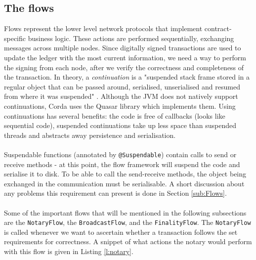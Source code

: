 \documentclass[12pt,twoside]{article}
\begin{document}
\subsection{The flows}
\label{sub:TheFlows}
Flows represent the lower level network protocols that implement contract-specific business logic. These actions are performed sequentially, exchanging messages across multiple nodes. Since digitally signed transactions are used to update the ledger with the most current information, we need a way to perform the signing from each node, after we verify the correctness and completeness of the transaction. In theory, a \textit{continuation} is a "suspended stack frame stored in a regular object that can be passed around, serialised, unserialised and resumed from where it was suspended" \cite{Corda:docs}. Although the JVM does not natively support continuations, Corda uses the Quasar library which implements them. Using continuations has several benefits: the code is free of callbacks (looks like sequential code), suspended continuations take up less space than suspended threads and abstracts away persistence and serialisation.
\\ \\
Suspendable functions (annotated by \verb|@Suspendable|) contain calls to send or receive methods - at this point, the flow framework will suspend the code and serialise it to disk. To be able to call the send-receive methods, the object being exchanged in the communication must be serialisable. A short discussion about any problems this requirement can present is done in Section \ref{sub:Flows}.
\\ \\
Some of the important flows that will be mentioned in the following subsections are the \verb|NotaryFlow|, the \verb|BroadcastFlow|, and the \verb|FinalityFlow|. The \verb|NotaryFlow| is called whenever we want to ascertain whether a transaction follows the set requirements for correctness. A snippet of what actions the notary would perform with this flow is given in Listing \ref{l:notary}.


\end{document}
